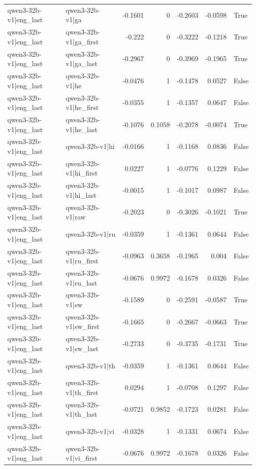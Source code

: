 \begin{table}
\begin{tabular}{l l r r r r l}
qwen3-32b-v1|eng_last & qwen3-32b-v1|ga & -0.1601 & 0 & -0.2603 & -0.0598 & True \\
qwen3-32b-v1|eng_last & qwen3-32b-v1|ga_first & -0.222 & 0 & -0.3222 & -0.1218 & True \\
qwen3-32b-v1|eng_last & qwen3-32b-v1|ga_last & -0.2967 & 0 & -0.3969 & -0.1965 & True \\
qwen3-32b-v1|eng_last & qwen3-32b-v1|he & -0.0476 & 1 & -0.1478 & 0.0527 & False \\
qwen3-32b-v1|eng_last & qwen3-32b-v1|he_first & -0.0355 & 1 & -0.1357 & 0.0647 & False \\
qwen3-32b-v1|eng_last & qwen3-32b-v1|he_last & -0.1076 & 0.1058 & -0.2078 & -0.0074 & True \\
qwen3-32b-v1|eng_last & qwen3-32b-v1|hi & -0.0166 & 1 & -0.1168 & 0.0836 & False \\
qwen3-32b-v1|eng_last & qwen3-32b-v1|hi_first & 0.0227 & 1 & -0.0776 & 0.1229 & False \\
qwen3-32b-v1|eng_last & qwen3-32b-v1|hi_last & -0.0015 & 1 & -0.1017 & 0.0987 & False \\
qwen3-32b-v1|eng_last & qwen3-32b-v1|raw & -0.2023 & 0 & -0.3026 & -0.1021 & True \\
qwen3-32b-v1|eng_last & qwen3-32b-v1|ru & -0.0359 & 1 & -0.1361 & 0.0644 & False \\
qwen3-32b-v1|eng_last & qwen3-32b-v1|ru_first & -0.0963 & 0.3658 & -0.1965 & 0.004 & False \\
qwen3-32b-v1|eng_last & qwen3-32b-v1|ru_last & -0.0676 & 0.9972 & -0.1678 & 0.0326 & False \\
qwen3-32b-v1|eng_last & qwen3-32b-v1|sw & -0.1589 & 0 & -0.2591 & -0.0587 & True \\
qwen3-32b-v1|eng_last & qwen3-32b-v1|sw_first & -0.1665 & 0 & -0.2667 & -0.0663 & True \\
qwen3-32b-v1|eng_last & qwen3-32b-v1|sw_last & -0.2733 & 0 & -0.3735 & -0.1731 & True \\
qwen3-32b-v1|eng_last & qwen3-32b-v1|th & -0.0359 & 1 & -0.1361 & 0.0644 & False \\
qwen3-32b-v1|eng_last & qwen3-32b-v1|th_first & 0.0294 & 1 & -0.0708 & 0.1297 & False \\
qwen3-32b-v1|eng_last & qwen3-32b-v1|th_last & -0.0721 & 0.9852 & -0.1723 & 0.0281 & False \\
qwen3-32b-v1|eng_last & qwen3-32b-v1|vi & -0.0328 & 1 & -0.1331 & 0.0674 & False \\
qwen3-32b-v1|eng_last & qwen3-32b-v1|vi_first & -0.0676 & 0.9972 & -0.1678 & 0.0326 & False \\

\end{tabular}
\end{table}
